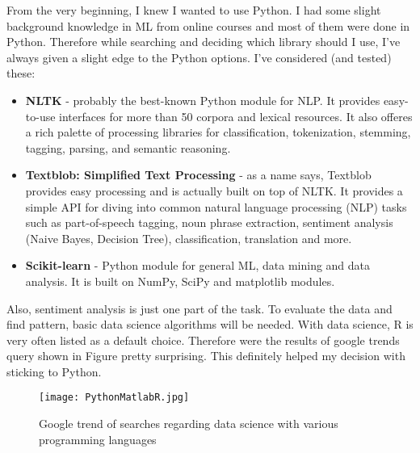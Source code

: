 From the very beginning, I knew I wanted to use Python. I had some slight background knowledge in ML from online courses and most of them were done in Python. Therefore while searching and deciding which library should I use, I've always given a slight edge to the Python options. I've considered (and tested) these:
\begin{itemize}
\item \textbf{NLTK} - probably the best-known Python module for NLP. It provides easy-to-use interfaces for more than 50 corpora and lexical resources. It also offeres a rich palette of processing libraries for classification, tokenization, stemming, tagging, parsing, and semantic reasoning.
\item \textbf{Textblob: Simplified Text Processing} - as a name says, Textblob provides easy processing and is actually built on top of NLTK. It provides a simple API for diving into common natural language processing (NLP) tasks such as part-of-speech tagging, noun phrase extraction, sentiment analysis (Naive Bayes, Decision Tree), classification, translation and more.
\item \textbf{Scikit-learn} - Python module for general ML, data mining and data analysis. It is built on NumPy, SciPy and matplotlib modules.
\end{itemize}

Also, sentiment analysis is just one part of the task. To evaluate the data and find pattern, basic data science algorithms will be needed. With data science, R is very often listed as a default choice. Therefore were the results of google trends query shown in Figure  pretty surprising. This definitely helped my decision with sticking to Python.

\begin{figure}[H]%
    \centering
	\texttt{[image: PythonMatlabR.jpg]}
    \caption{Google trend of searches regarding data science with various programming languages}%
    \label{fig:PythonMatlabR}%
\end{figure}
